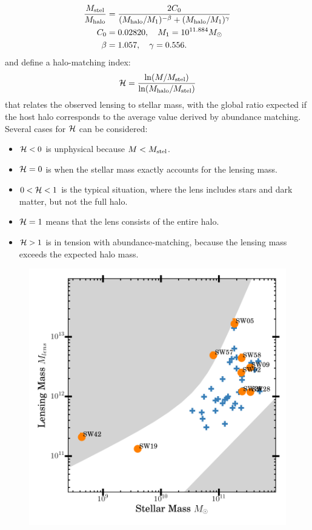 \begin{equation}
\begin{aligned}
\frac{M_\text{stel}}{M_\text{halo}} &= \frac{2C_0}{(M_\text{halo}/M_1)^{-\beta} +
                                     (M_\text{halo}/M_1)^\gamma} \\
C_0 &= 0.02820, \quad M_1 = 10^{11.884} M_\odot \\
\beta &= 1.057, \quad \gamma = 0.556.
\end{aligned}
\end{equation}
and define a halo-matching index:
\begin{equation}
\mathcal{H} = \frac{\ln(M/M_\text{stel})}{\ln(M_\text{halo}/M_\text{stel})}
\end{equation}
that relates the observed lensing to stellar mass, with the
global ratio expected if the host halo corresponds to the
average value derived by abundance matching. Several cases
for $\mathcal{H}$ can be considered:
\begin{itemize}
\item $\mathcal{H} < 0$ is unphysical because $M<M_\text{stel}$.
\item $\mathcal{H} = 0$ is when the stellar mass exactly accounts for the
  lensing mass.
\item $0 < \mathcal{H} < 1$ is the typical situation, where the lens
  includes stars and dark matter, but not the full halo.
\item $\mathcal{H} = 1$ means that the lens consists of the entire halo.
\item $\mathcal{H} > 1$ is in tension with abundance-matching, because the
  lensing mass exceeds the expected halo mass.
\end{itemize}

\begin{figure}
\includegraphics[width=\linewidth]{img/mlens_vs_mstel_one/mstel_vs_mtot_one}
\caption{}
\end{figure}

